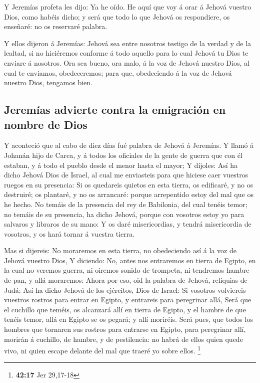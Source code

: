  Y Jeremías profeta les dijo: Ya he oído. He aquí que voy á
orar á Jehová vuestro Dios, como habéis dicho; y será que todo lo que
Jehová os respondiere, os enseñaré: no os reservaré palabra.

 Y ellos dijeron á Jeremías: Jehová sea entre nosotros
testigo de la verdad y de la lealtad, si no hiciéremos conforme á todo
aquello para lo cual Jehová tu Dios te enviare á nosotros. 
Ora sea bueno, ora malo, á la voz de Jehová nuestro Dios, al cual te
enviamos, obedeceremos; para que, obedeciendo á la voz de Jehová nuestro
Dios, tengamos bien.

\hypertarget{jeremuxedas-advierte-contra-la-emigraciuxf3n-en-nombre-de-dios}{%
\subsection{Jeremías advierte contra la emigración en nombre de
Dios}\label{jeremuxedas-advierte-contra-la-emigraciuxf3n-en-nombre-de-dios}}

 Y aconteció que al cabo de diez días fué palabra de Jehová
á Jeremías.  Y llamó á Johanán hijo de Carea, y á todos los
oficiales de la gente de guerra que con él estaban, y á todo el pueblo
desde el menor hasta el mayor;  Y díjoles: Así ha dicho
Jehová Dios de Israel, al cual me enviasteis para que hiciese caer
vuestros ruegos en su presencia:  Si os quedareis quietos
en esta tierra, os edificaré, y no os destruiré; os plantaré, y no os
arrancaré: porque arrepentido estoy del mal que os he hecho.
 No temáis de la presencia del rey de Babilonia, del cual
tenéis temor; no temáis de su presencia, ha dicho Jehová, porque con
vosotros estoy yo para salvaros y libraros de su mano:  Y
os daré misericordias, y tendrá misericordia de vosotros, y os hará
tornar á vuestra tierra.

 Mas si dijereis: No moraremos en esta tierra, no
obedeciendo así á la voz de Jehová vuestro Dios,  Y
diciendo: No, antes nos entraremos en tierra de Egipto, en la cual no
veremos guerra, ni oiremos sonido de trompeta, ni tendremos hambre de
pan, y allá moraremos:  Ahora por eso, oid la palabra de
Jehová, reliquias de Judá: Así ha dicho Jehová de los ejércitos, Dios de
Israel: Si vosotros volviereis vuestros rostros para entrar en Egipto, y
entrareis para peregrinar allá,  Será que el cuchillo que
teméis, os alcanzará allí en tierra de Egipto, y el hambre de que tenéis
temor, allá en Egipto se os pegará; y allí moriréis.  Será
pues, que todos los hombres que tornaren sus rostros para entrarse en
Egipto, para peregrinar allí, morirán á cuchillo, de hambre, y de
pestilencia: no habrá de ellos quien quede vivo, ni quien escape delante
del mal que traeré yo sobre ellos. \footnote{\textbf{42:17} Jer 29,17-18}

